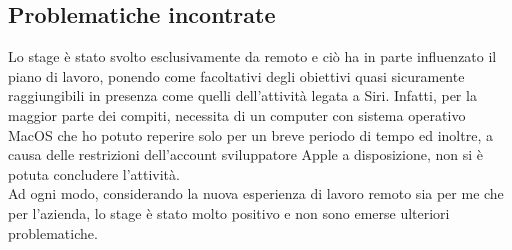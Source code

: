 \subsection{Problematiche incontrate}
Lo stage è stato svolto esclusivamente da remoto e ciò ha in parte influenzato il piano di lavoro, ponendo come facoltativi degli obiettivi quasi sicuramente raggiungibili in presenza come quelli dell'attività legata a Siri. Infatti, per la maggior parte dei compiti, necessita di un computer con sistema operativo MacOS che ho potuto reperire solo per un breve periodo di tempo ed inoltre, a causa delle restrizioni dell'account sviluppatore Apple a disposizione, non si è potuta concludere l'attività. \\
Ad ogni modo, considerando la nuova esperienza di lavoro remoto sia per me che per l'azienda, lo stage è stato molto positivo e non sono emerse ulteriori problematiche.
